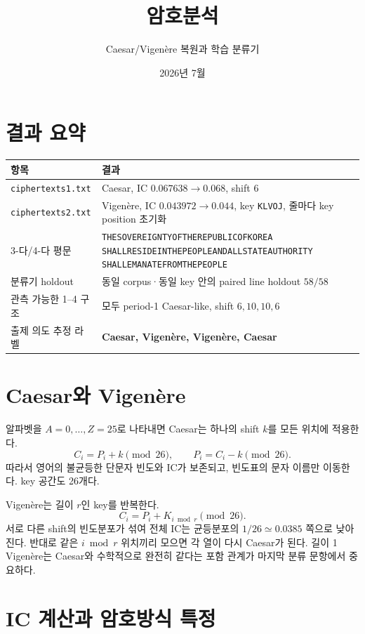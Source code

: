 \documentclass[10pt,a4paper]{article}
\title{암호분석}
\author{Caesar/Vigenère 복원과 학습 분류기}
\date{2026년 7월}
\begin{document}
\maketitle

\section*{결과 요약}

\begin{center}
\begin{tabularx}{\textwidth}{lX}
\toprule
항목 & 결과 \\
\midrule
\texttt{ciphertexts1.txt} & Caesar, IC $0.067638\to\mathbf{0.068}$,
shift $6$ \\
\texttt{ciphertexts2.txt} & Vigenère, IC $0.043972\to\mathbf{0.044}$,
key \texttt{KLVOJ}, 줄마다 key position 초기화 \\
3-다/4-다 평문 &
\texttt{THESOVEREIGNTYOFTHEREPUBLICOFKOREA}\newline
\texttt{SHALLRESIDEINTHEPEOPLEANDALLSTATEAUTHORITY}\newline
\texttt{SHALLEMANATEFROMTHEPEOPLE} \\
분류기 holdout &
동일 corpus·동일 key 안의 paired line holdout $58/58$ \\
관측 가능한 1--4 구조 &
모두 period-1 Caesar-like, shift $6,10,10,6$ \\
출제 의도 추정 라벨 &
\textbf{Caesar, Vigenère, Vigenère, Caesar} \\
\bottomrule
\end{tabularx}
\end{center}

\section{Caesar와 Vigenère}

알파벳을 $A=0,\ldots,Z=25$로 나타내면 Caesar는 하나의 shift $k$를
모든 위치에 적용한다.
\[
 C_i=P_i+k\pmod {26},\qquad P_i=C_i-k\pmod {26}.
\]
따라서 영어의 불균등한 단문자 빈도와 IC가 보존되고, 빈도표의 문자
이름만 이동한다. key 공간도 26개다.

Vigenère는 길이 $r$인 key를 반복한다.
\[
 C_i=P_i+K_{i\bmod r}\pmod {26}.
\]
서로 다른 shift의 빈도분포가 섞여 전체 IC는 균등분포의
$1/26\simeq0.0385$ 쪽으로 낮아진다. 반대로 같은 $i\bmod r$ 위치끼리
모으면 각 열이 다시 Caesar가 된다. 길이 1 Vigenère는 Caesar와
수학적으로 완전히 같다는 포함 관계가 마지막 분류 문항에서 중요하다.

\section{IC 계산과 암호방식 특정}
\end{document}
